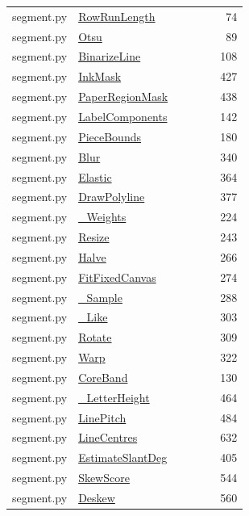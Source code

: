 \documentclass[11pt,a4paper,oneside]{report}
\begin{document}
\begin{longtable}{p{0.28\linewidth}p{0.48\linewidth}r}
segment.py & \hyperref[fn:segment:RowRunLength]{RowRunLength} & 74\\
segment.py & \hyperref[fn:segment:Otsu]{Otsu} & 89\\
segment.py & \hyperref[fn:segment:BinarizeLine]{BinarizeLine} & 108\\
segment.py & \hyperref[fn:segment:InkMask]{InkMask} & 427\\
segment.py & \hyperref[fn:segment:PaperRegionMask]{PaperRegionMask} & 438\\
segment.py & \hyperref[fn:segment:LabelComponents]{LabelComponents} & 142\\
segment.py & \hyperref[fn:segment:PieceBounds]{PieceBounds} & 180\\
segment.py & \hyperref[fn:segment:Blur]{Blur} & 340\\
segment.py & \hyperref[fn:segment:Elastic]{Elastic} & 364\\
segment.py & \hyperref[fn:segment:DrawPolyline]{DrawPolyline} & 377\\
segment.py & \hyperref[fn:segment:-Weights]{\_Weights} & 224\\
segment.py & \hyperref[fn:segment:Resize]{Resize} & 243\\
segment.py & \hyperref[fn:segment:Halve]{Halve} & 266\\
segment.py & \hyperref[fn:segment:FitFixedCanvas]{FitFixedCanvas} & 274\\
segment.py & \hyperref[fn:segment:-Sample]{\_Sample} & 288\\
segment.py & \hyperref[fn:segment:-Like]{\_Like} & 303\\
segment.py & \hyperref[fn:segment:Rotate]{Rotate} & 309\\
segment.py & \hyperref[fn:segment:Warp]{Warp} & 322\\
segment.py & \hyperref[fn:segment:CoreBand]{CoreBand} & 130\\
segment.py & \hyperref[fn:segment:-LetterHeight]{\_LetterHeight} & 464\\
segment.py & \hyperref[fn:segment:LinePitch]{LinePitch} & 484\\
segment.py & \hyperref[fn:segment:LineCentres]{LineCentres} & 632\\
segment.py & \hyperref[fn:segment:EstimateSlantDeg]{EstimateSlantDeg} & 405\\
segment.py & \hyperref[fn:segment:SkewScore]{SkewScore} & 544\\
segment.py & \hyperref[fn:segment:Deskew]{Deskew} & 560\\

\end{longtable}
\end{document}
